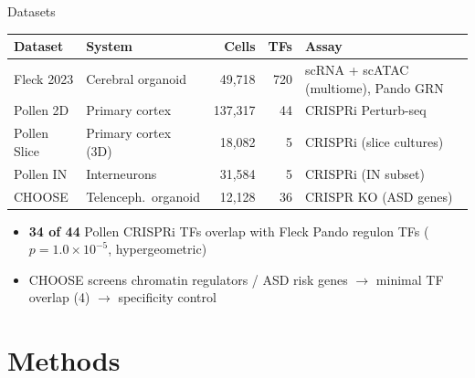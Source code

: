 \documentclass[aspectratio=169,11pt]{beamer}
\begin{document}

\begin{frame}{Datasets}

\begin{table}
\centering
\small
\begin{tabular}{llrrp{4.5cm}}
\toprule
\textbf{Dataset} & \textbf{System} & \textbf{Cells} & \textbf{TFs} & \textbf{Assay} \\
\midrule
Fleck 2023 & Cerebral organoid & 49{,}718 & 720 & scRNA + scATAC (multiome), Pando GRN \\
\rowcolor{pollengreen!10}
Pollen 2D & Primary cortex & 137{,}317 & 44 & CRISPRi Perturb-seq \\
\rowcolor{pollengreen!10}
Pollen Slice & Primary cortex (3D) & 18{,}082 & 5 & CRISPRi (slice cultures) \\
\rowcolor{pollengreen!10}
Pollen IN & Interneurons & 31{,}584 & 5 & CRISPRi (IN subset) \\
\rowcolor{chooseviolet!10}
CHOOSE & Telenceph.\ organoid & 12{,}128 & 36 & CRISPR KO (ASD genes) \\
\bottomrule
\end{tabular}
\end{table}

\vspace{0.5em}

\begin{itemize}
    \item \textbf{34 of 44} Pollen CRISPRi TFs overlap with Fleck Pando regulon TFs ($p = 1.0 \times 10^{-5}$, hypergeometric)
    \item CHOOSE screens chromatin regulators / ASD risk genes $\rightarrow$ minimal TF overlap (4) $\rightarrow$ specificity control
\end{itemize}

\end{frame}

\section{Methods}
\end{document}
